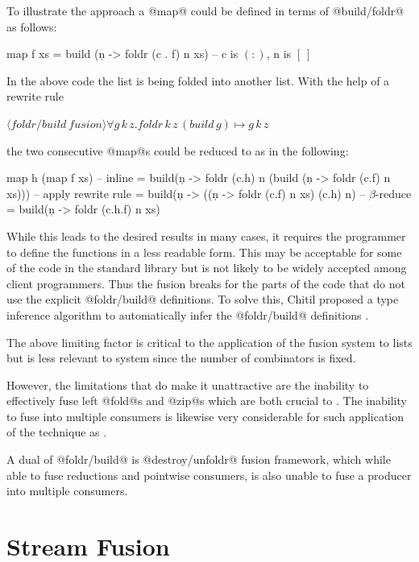 \documentclass[preamble.tex]{subfiles}
\begin{document}
To illustrate the approach a @map@ could be defined in terms of @build/foldr@ as follows:

\begin{hscode}[mathescape]
map f xs = build (\c n -> foldr (c . f) n xs)
-- c is $\mathtt{(:)}$, n is $\mathtt{[\ ]}$
\end{hscode}


In the above code the list is being folded into another list. With the help of a rewrite rule

$\langle \mathit{foldr/build\ fusion} \rangle \forall g\, k\, z.\mathit{foldr}\, k\, z\,(build\, g)\mapsto g\, k\, z$

the two consecutive @map@s could be reduced to as in the following:

\begin{hscode}[mathescape]
map h (map f xs)
 -- inline
 = build(\c n -> foldr (c.h) n 
  (build (\c n -> foldr (c.f) n xs)))
 -- apply rewrite rule
 = build(\c n -> ((\c n -> foldr (c.f) n xs) (c.h) n)
 -- $\beta$-reduce
 = build(\c n -> foldr (c.h.f) n xs)
\end{hscode}


While this leads to the desired results in many cases, it requires the programmer to define the functions in a less readable form. This may be acceptable for some of the code in the standard library but is not likely to be widely accepted among client programmers. Thus the fusion breaks for the parts of the code that do not use the explicit @foldr/build@ definitions. To solve this, Chitil proposed a type inference algorithm to automatically infer the @foldr/build@ definitions \cite{Chi99}.

The above limiting factor is critical to the application of the fusion system to lists but is less relevant to \LiveFusion system since the number of combinators is fixed.

However, the limitations that do make it unattractive are the inability to effectively fuse left @fold@s and @zip@s which are both crucial to \DPH. The inability to fuse into multiple consumers is likewise very considerable for such application of the technique as \DPH. 

A dual of @foldr/build@ is @destroy/unfoldr@ \cite{DestroyUnfoldr} fusion framework, which while able to fuse reductions and pointwise consumers, is also unable to fuse a producer into multiple consumers.


\clearpage

\section{Stream Fusion}
\label{sec:stream-fusion}
\isf{}
\end{document}
